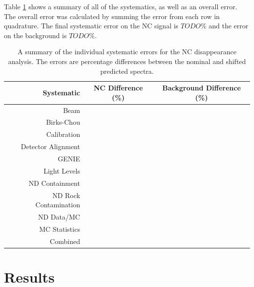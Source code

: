 Table \ref{tab:SystSummary} shows a summary of all of the systematics, as well as an overall error. The overall error was calculated by summing the error from each row in quadrature. The final systematic error on the NC signal is $TODO\%$ and the error on the background is $TODO\%$.
\begin{table}[h]
  \begin{center}
    \caption[Systematic Error Summary]{A summary of the individual systematic errors for the NC disappearance analysis. The errors are percentage differences between the nominal and shifted predicted spectra.}
    \label{tab:SystSummary}
    \begin{tabular}{r c c}
      \hline\hline
      Systematic & NC Difference (\%) & Background Difference (\%) \\
      \hline
      Beam & & \\
      Birks-Chou & & \\
      Calibration & & \\
      Detector Alignment & & \\
      GENIE & & \\
      Light Levels & & \\
      ND Containment & & \\
      ND Rock Contamination & & \\
      ND Data/MC & & \\
      MC Statistics & & \\
      \hline
      Combined & & \\
      \hline
    \end{tabular}
  \end{center}
\end{table}

\section{Results}

